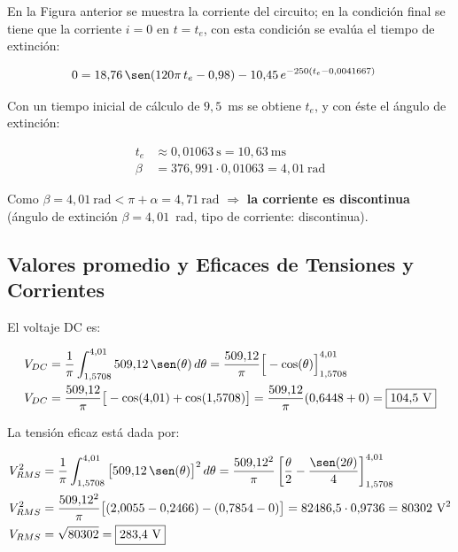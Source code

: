 \documentclass[11pt]{article}
\begin{document}
En la Figura anterior se muestra la corriente del circuito; en la condici\'on
final se tiene que la corriente $i=0$ en $t=t_e$, con esta condici\'on se
eval\'ua el tiempo de extinci\'on:

\begin{align*}
0 &= 18{,}76\,\sen(120\pi\,t_e - 0{,}98) - 10{,}45\,e^{-250(t_e-0{,}0041667)}
\end{align*}

Con un tiempo inicial de c\'alculo de $9{,}5$~ms se obtiene $t_e$, y con \'este
el \'angulo de extinci\'on:

\begin{align*}
t_e &\approx 0{,}01063\ \text{s} = \boxed{10{,}63\ \text{ms}} \\
\beta &= 376{,}991\cdot 0{,}01063 = \boxed{4{,}01\ \text{rad}}
\end{align*}

Como $\beta = 4{,}01\ \text{rad} < \pi+\alpha = 4{,}71\ \text{rad}$
$\Rightarrow$ \textbf{la corriente es discontinua} (\'angulo de extinci\'on
$\beta=4{,}01$~rad, tipo de corriente: discontinua).

\subsection{Valores promedio y Eficaces de Tensiones y Corrientes}

El voltaje DC es:

\begin{align*}
V_{DC} &= \frac{1}{\pi}\int_{1{,}5708}^{4{,}01} 509{,}12\,\sen(\theta)\,d\theta
        = \frac{509{,}12}{\pi}\Big[-\cos(\theta)\Big]_{1{,}5708}^{4{,}01} \\
V_{DC} &= \frac{509{,}12}{\pi}\big[-\cos(4{,}01)+\cos(1{,}5708)\big]
        = \frac{509{,}12}{\pi}(0{,}6448+0) = \boxed{104{,}5\ \text{V}}
\end{align*}

La tensi\'on eficaz est\'a dada por:

\begin{align*}
V_{RMS}^2 &= \frac{1}{\pi}\int_{1{,}5708}^{4{,}01} \big[509{,}12\,\sen(\theta)\big]^2\,d\theta
           = \frac{509{,}12^2}{\pi}\left[\frac{\theta}{2}-\frac{\sen(2\theta)}{4}\right]_{1{,}5708}^{4{,}01} \\
V_{RMS}^2 &= \frac{509{,}12^2}{\pi}\big[(2{,}0055-0{,}2466)-(0{,}7854-0)\big]
           = 82486{,}5\cdot 0{,}9736 = 80302\ \text{V}^2 \\
V_{RMS} &= \sqrt{80302} = \boxed{283{,}4\ \text{V}}
\end{align*}
\end{document}
